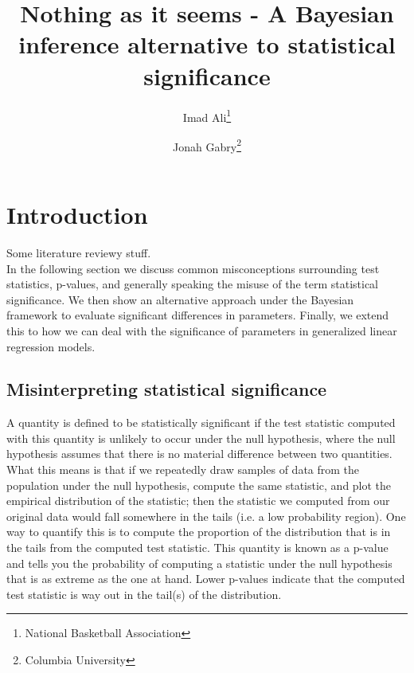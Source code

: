 \documentclass[12pt]{article}
\title{Nothing as it seems - A Bayesian inference alternative to statistical significance}
\author{Imad Ali\thanks{National Basketball Association} \and Jonah Gabry\thanks{Columbia University}}
\begin{document}
\maketitle
{}
\tableofcontents
\newpage

\def\ci{\perp\!\!\!\perp}
\def\ex{\mathbb{E}}
\def\prob{\mathbb{P}}
\def\ind{\mathbb{I}}
\def\grad{\triangledown}
\def\bigo{\mathcal{O}}

\section{Introduction}

Some literature reviewy stuff. \\

\noindent In the following section we discuss common misconceptions surrounding test statistics, p-values, and generally speaking the misuse of the term statistical significance. We then show an alternative approach under the Bayesian framework to evaluate significant differences in parameters. Finally, we extend this to how we can deal with the significance of parameters in generalized linear regression models. \\

\subsection{Misinterpreting statistical significance}

\noindent A quantity is defined to be statistically significant if the test statistic computed with this quantity is unlikely to occur under the null hypothesis, where the null hypothesis assumes that there is no material difference between two quantities. What this means is that if we repeatedly draw samples of data from the population under the null hypothesis, compute the same statistic, and plot the empirical distribution of the statistic; then the statistic we computed from our original data would fall somewhere in the tails (i.e. a low probability region). One way to quantify this is to compute the proportion of the distribution that is in the tails from the computed test statistic. This quantity is known as a p-value and tells you the probability of computing a statistic under the null hypothesis that is as extreme as the one at hand. Lower p-values indicate that the computed test statistic is way out in the tail(s) of the distribution. \\
\end{document}
